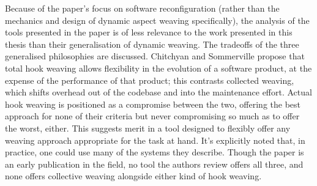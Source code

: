 Because of the paper's focus on software reconfiguration (rather than the
mechanics and design of dynamic aspect weaving specifically), the analysis of
the tools presented in the paper is of less relevance to the work presented in
this thesis than their generalisation of dynamic weaving. The tradeoffs of the
three generalised philosophies are discussed. Chitchyan and Sommerville propose
that total hook weaving allows flexibility in the evolution of a software
product, at the expense of the performance of that product; this contrasts
collected weaving, which shifts overhead out of the codebase and into the
maintenance effort. Actual hook weaving is positioned as a compromise between
the two, offering the best approach for none of their criteria but never
compromising so much as to offer the worst, either. This suggests merit in a
tool designed to flexibly offer any weaving approach appropriate for the task at
hand. It's explicitly noted that, in practice, one could use many of the systems
they describe. Though the paper is an early publication in the field, no tool
the authors review offers all three, and none offers collective weaving
alongside either kind of hook weaving.


